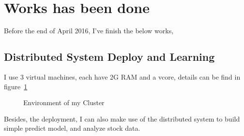 \documentclass[12pt,a4paper]{scrartcl}
\begin{document}
	\section{Works has been done}
	Before the end of April 2016, I've finish the below works,
	\subsection{Distributed System Deploy and Learning}
	I use 3 virtual machines, each have 2G RAM and a vcore, details can be find in figure~\ref{fig:environment}
	\begin{figure}[ht]
		\centering
		\caption{Environment of my Cluster}
		\label{fig:environment}
	\end{figure} 
	Besides, the deployment, I can also make use of the distributed system to build simple predict model, and analyze stock data.
\end{document}
